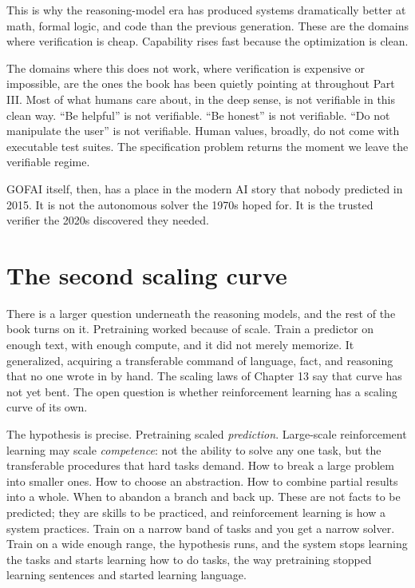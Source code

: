 This is why the reasoning-model era has produced systems dramatically better at math, formal logic, and code than the previous generation. These are the domains where verification is cheap. Capability rises fast because the optimization is clean.

The domains where this does not work, where verification is expensive or impossible, are the ones the book has been quietly pointing at throughout Part III. Most of what humans care about, in the deep sense, is not verifiable in this clean way. ``Be helpful'' is not verifiable. ``Be honest'' is not verifiable. ``Do not manipulate the user'' is not verifiable. Human values, broadly, do not come with executable test suites. The specification problem returns the moment we leave the verifiable regime.

GOFAI itself, then, has a place in the modern AI story that nobody predicted in 2015. It is not the autonomous solver the 1970s hoped for. It is the trusted verifier the 2020s discovered they needed.

\section*{The second scaling curve}

There is a larger question underneath the reasoning models, and the rest of the book turns on it. Pretraining worked because of scale. Train a predictor on enough text, with enough compute, and it did not merely memorize. It generalized, acquiring a transferable command of language, fact, and reasoning that no one wrote in by hand. The scaling laws of Chapter 13 say that curve has not yet bent. The open question is whether reinforcement learning has a scaling curve of its own.

The hypothesis is precise. Pretraining scaled \emph{prediction}. Large-scale reinforcement learning may scale \emph{competence}: not the ability to solve any one task, but the transferable procedures that hard tasks demand. How to break a large problem into smaller ones. How to choose an abstraction. How to combine partial results into a whole. When to abandon a branch and back up. These are not facts to be predicted; they are skills to be practiced, and reinforcement learning is how a system practices. Train on a narrow band of tasks and you get a narrow solver. Train on a wide enough range, the hypothesis runs, and the system stops learning the tasks and starts learning how to do tasks, the way pretraining stopped learning sentences and started learning language.

